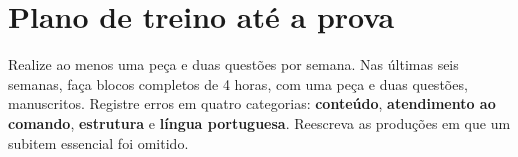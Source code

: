 \section{Plano de treino até a prova}

Realize ao menos uma peça e duas questões por semana. Nas últimas seis semanas, faça blocos completos de 4 horas, com uma peça e duas questões, manuscritos. Registre erros em quatro categorias: \textbf{conteúdo}, \textbf{atendimento ao comando}, \textbf{estrutura} e \textbf{língua portuguesa}. Reescreva as produções em que um subitem essencial foi omitido.
